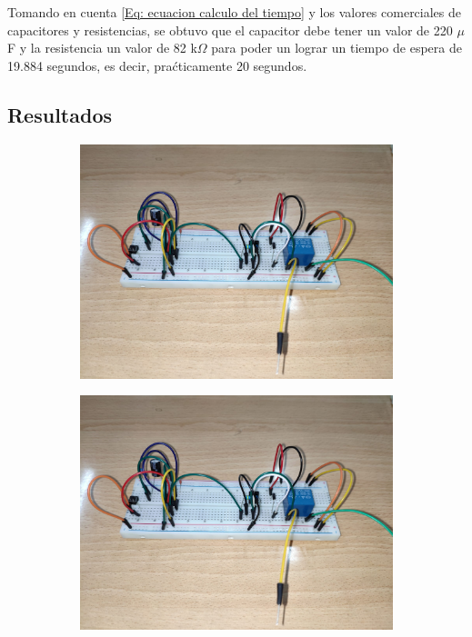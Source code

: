 Tomando en cuenta \eqref{Eq: ecuacion calculo del tiempo} y los valores comerciales de capacitores y resistencias, se obtuvo que el capacitor debe tener un valor de 220 $\mu$F y la resistencia un valor de 82 k$\Omega$ para poder un lograr un tiempo de espera de 19.884 segundos, es decir, praćticamente 20 segundos.

\subsection{Resultados}

\begin{figure}[htb]
    \centering
    \begin{subfigure}[htb]{0.45\textwidth}
        \centering
        \includegraphics[width=\textwidth]{media/circuito_real_1}
        \caption{}
    \end{subfigure}
    \centering
    \begin{subfigure}[htb]{0.45\textwidth}
        \centering
        \includegraphics[width=\textwidth]{media/circuito_real_1}

\end{subfigure}
\end{figure}
